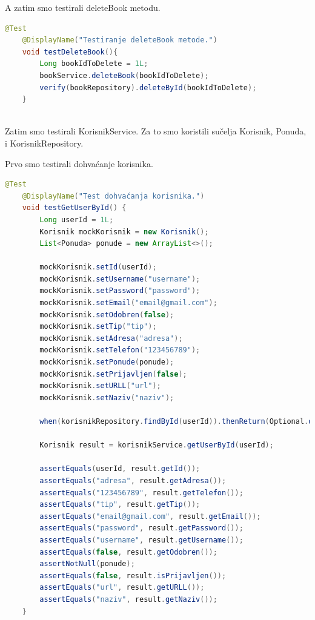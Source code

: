    
			A zatim smo testirali deleteBook metodu. 
                  \begin{lstlisting}[language=Java, label=lst:java_example, basicstyle=\scriptsize, baselinestretch=0.9]
 @Test
    @DisplayName("Testiranje deleteBook metode.")
    void testDeleteBook(){
        Long bookIdToDelete = 1L;
        bookService.deleteBook(bookIdToDelete);
        verify(bookRepository).deleteById(bookIdToDelete);
    }
    
\end{lstlisting}

            Zatim smo testirali KorisnikService. Za to smo koristili sučelja Korisnik, Ponuda, i KorisnikRepository.
            
			Prvo smo testirali dohvaćanje korisnika. 
                  \begin{lstlisting}[language=Java, label=lst:java_example, basicstyle=\scriptsize, baselinestretch=0.9]
 @Test
    @DisplayName("Test dohvaćanja korisnika.")
    void testGetUserById() {
        Long userId = 1L;
        Korisnik mockKorisnik = new Korisnik();
        List<Ponuda> ponude = new ArrayList<>();

        mockKorisnik.setId(userId);
        mockKorisnik.setUsername("username");
        mockKorisnik.setPassword("password");
        mockKorisnik.setEmail("email@gmail.com");
        mockKorisnik.setOdobren(false);
        mockKorisnik.setTip("tip");
        mockKorisnik.setAdresa("adresa");
        mockKorisnik.setTelefon("123456789");
        mockKorisnik.setPonude(ponude);
        mockKorisnik.setPrijavljen(false);
        mockKorisnik.setURLL("url");
        mockKorisnik.setNaziv("naziv");

        when(korisnikRepository.findById(userId)).thenReturn(Optional.of(mockKorisnik));

        Korisnik result = korisnikService.getUserById(userId);

        assertEquals(userId, result.getId());
        assertEquals("adresa", result.getAdresa());
        assertEquals("123456789", result.getTelefon());
        assertEquals("tip", result.getTip());
        assertEquals("email@gmail.com", result.getEmail());
        assertEquals("password", result.getPassword());
        assertEquals("username", result.getUsername());
        assertEquals(false, result.getOdobren());
        assertNotNull(ponude);
        assertEquals(false, result.isPrijavljen());
        assertEquals("url", result.getURLL());
        assertEquals("naziv", result.getNaziv());
    }

    
\end{lstlisting}
            
